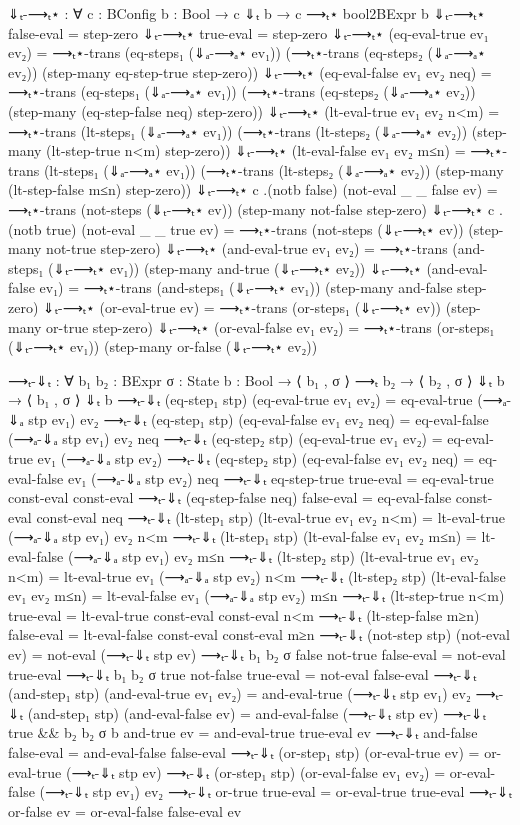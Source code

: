 \documentclass{lecturenotes}
\begin{document}
\begin{code}[hide]
⇓ₜ-⟶ₜ⋆ : ∀ {c : BConfig} {b : Bool} → c ⇓ₜ b → c ⟶ₜ⋆ bool2BExpr b
⇓ₜ-⟶ₜ⋆ false-eval = step-zero
⇓ₜ-⟶ₜ⋆ true-eval = step-zero
⇓ₜ-⟶ₜ⋆ (eq-eval-true ev₁ ev₂) =
   ⟶ₜ⋆-trans (eq-steps₁ (⇓ₐ-⟶ₐ⋆ ev₁))
  (⟶ₜ⋆-trans (eq-steps₂ (⇓ₐ-⟶ₐ⋆ ev₂))
             (step-many eq-step-true step-zero))
⇓ₜ-⟶ₜ⋆ (eq-eval-false ev₁ ev₂ neq) =
   ⟶ₜ⋆-trans (eq-steps₁ (⇓ₐ-⟶ₐ⋆ ev₁))
  (⟶ₜ⋆-trans (eq-steps₂ (⇓ₐ-⟶ₐ⋆ ev₂))
             (step-many (eq-step-false neq) step-zero))
⇓ₜ-⟶ₜ⋆ (lt-eval-true ev₁ ev₂ n<m) =
   ⟶ₜ⋆-trans (lt-steps₁ (⇓ₐ-⟶ₐ⋆ ev₁))
  (⟶ₜ⋆-trans (lt-steps₂ (⇓ₐ-⟶ₐ⋆ ev₂))
             (step-many (lt-step-true n<m) step-zero))
⇓ₜ-⟶ₜ⋆ (lt-eval-false ev₁ ev₂ m≤n) =
   ⟶ₜ⋆-trans (lt-steps₁ (⇓ₐ-⟶ₐ⋆ ev₁))
  (⟶ₜ⋆-trans (lt-steps₂ (⇓ₐ-⟶ₐ⋆ ev₂))
             (step-many (lt-step-false m≤n) step-zero))
⇓ₜ-⟶ₜ⋆ {c} {.(notb false)} (not-eval {_} {_} {false} ev) = ⟶ₜ⋆-trans (not-steps (⇓ₜ-⟶ₜ⋆ ev)) (step-many not-false step-zero)
⇓ₜ-⟶ₜ⋆ {c} {.(notb true)} (not-eval {_} {_} {true} ev) = ⟶ₜ⋆-trans (not-steps (⇓ₜ-⟶ₜ⋆ ev)) (step-many not-true step-zero)
⇓ₜ-⟶ₜ⋆ (and-eval-true ev₁ ev₂) = ⟶ₜ⋆-trans (and-steps₁ (⇓ₜ-⟶ₜ⋆ ev₁)) (step-many and-true (⇓ₜ-⟶ₜ⋆ ev₂))
⇓ₜ-⟶ₜ⋆ (and-eval-false ev₁) = ⟶ₜ⋆-trans (and-steps₁ (⇓ₜ-⟶ₜ⋆ ev₁)) (step-many and-false step-zero)
⇓ₜ-⟶ₜ⋆ (or-eval-true ev) = ⟶ₜ⋆-trans (or-steps₁ (⇓ₜ-⟶ₜ⋆ ev)) (step-many or-true step-zero) 
⇓ₜ-⟶ₜ⋆ (or-eval-false ev₁ ev₂) = ⟶ₜ⋆-trans (or-steps₁ (⇓ₜ-⟶ₜ⋆ ev₁)) (step-many or-false (⇓ₜ-⟶ₜ⋆ ev₂))

⟶ₜ-⇓ₜ : ∀ {b₁ b₂ : BExpr} {σ : State} {b : Bool} → ⟨ b₁ , σ ⟩ ⟶ₜ b₂ → ⟨ b₂ , σ ⟩ ⇓ₜ b → ⟨ b₁ , σ ⟩ ⇓ₜ b
⟶ₜ-⇓ₜ (eq-step₁ stp) (eq-eval-true ev₁ ev₂) = eq-eval-true (⟶ₐ-⇓ₐ stp ev₁) ev₂
⟶ₜ-⇓ₜ (eq-step₁ stp) (eq-eval-false ev₁ ev₂ neq) = eq-eval-false (⟶ₐ-⇓ₐ stp ev₁) ev₂ neq
⟶ₜ-⇓ₜ (eq-step₂ stp) (eq-eval-true ev₁ ev₂) = eq-eval-true ev₁ (⟶ₐ-⇓ₐ stp ev₂)
⟶ₜ-⇓ₜ (eq-step₂ stp) (eq-eval-false ev₁ ev₂ neq) = eq-eval-false ev₁ (⟶ₐ-⇓ₐ stp ev₂) neq
⟶ₜ-⇓ₜ eq-step-true true-eval = eq-eval-true const-eval const-eval
⟶ₜ-⇓ₜ (eq-step-false neq) false-eval = eq-eval-false const-eval const-eval neq
⟶ₜ-⇓ₜ (lt-step₁ stp) (lt-eval-true ev₁ ev₂ n<m) = lt-eval-true (⟶ₐ-⇓ₐ stp ev₁) ev₂ n<m
⟶ₜ-⇓ₜ (lt-step₁ stp) (lt-eval-false ev₁ ev₂ m≤n) = lt-eval-false (⟶ₐ-⇓ₐ stp ev₁) ev₂ m≤n
⟶ₜ-⇓ₜ (lt-step₂ stp) (lt-eval-true ev₁ ev₂ n<m) = lt-eval-true ev₁ (⟶ₐ-⇓ₐ stp ev₂) n<m
⟶ₜ-⇓ₜ (lt-step₂ stp) (lt-eval-false ev₁ ev₂ m≤n) = lt-eval-false ev₁ (⟶ₐ-⇓ₐ stp ev₂) m≤n
⟶ₜ-⇓ₜ (lt-step-true n<m) true-eval = lt-eval-true const-eval const-eval n<m
⟶ₜ-⇓ₜ (lt-step-false m≥n) false-eval = lt-eval-false const-eval const-eval m≥n
⟶ₜ-⇓ₜ (not-step stp) (not-eval ev) = not-eval (⟶ₜ-⇓ₜ stp ev)
⟶ₜ-⇓ₜ {b₁} {b₂} {σ} {false} not-true false-eval = not-eval true-eval
⟶ₜ-⇓ₜ {b₁} {b₂} {σ} {true} not-false true-eval = not-eval false-eval
⟶ₜ-⇓ₜ (and-step₁ stp) (and-eval-true ev₁ ev₂) = and-eval-true (⟶ₜ-⇓ₜ stp ev₁) ev₂
⟶ₜ-⇓ₜ (and-step₁ stp) (and-eval-false ev) = and-eval-false (⟶ₜ-⇓ₜ stp ev)
⟶ₜ-⇓ₜ {true && b₂} {b₂} {σ} {b} and-true ev = and-eval-true true-eval ev
⟶ₜ-⇓ₜ and-false false-eval = and-eval-false false-eval
⟶ₜ-⇓ₜ (or-step₁ stp) (or-eval-true ev) = or-eval-true (⟶ₜ-⇓ₜ stp ev)
⟶ₜ-⇓ₜ (or-step₁ stp) (or-eval-false ev₁ ev₂) = or-eval-false (⟶ₜ-⇓ₜ stp ev₁) ev₂
⟶ₜ-⇓ₜ or-true true-eval = or-eval-true true-eval
⟶ₜ-⇓ₜ or-false ev = or-eval-false false-eval ev


\end{code}
\end{document}
